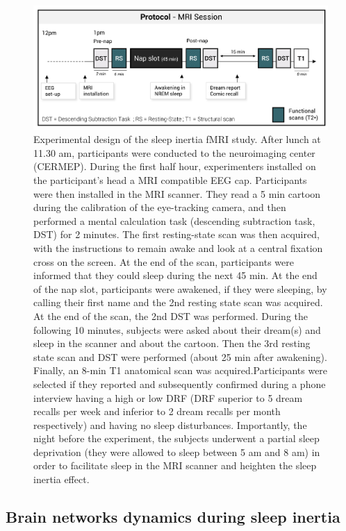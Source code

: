 \begin{figure}[htb]
	\includegraphics[width=\textwidth]{Fig/Intro/Intro_paradigm_fMRI/Intro_paradigm_fMRI.png}
	\caption[Experimental design of the fMRI study]{Experimental design of the sleep inertia fMRI study. After lunch at 11.30 am, participants were conducted to the neuroimaging center (CERMEP). During the first half hour, experimenters installed on the participant’s head a MRI compatible EEG cap. Participants were then installed in the MRI scanner. They read a 5 min cartoon during the calibration of the eye-tracking camera, and then performed a mental calculation task (descending subtraction task, DST) for 2 minutes. The first resting-state scan was then acquired, with the instructions to remain awake and look at a central fixation cross on the screen. At the end of the scan, participants were informed that they could sleep during the next 45 min. At the end of the nap slot, participants were awakened, if they were sleeping, by calling their first name and the 2nd resting state scan was acquired. At the end of the scan, the 2nd DST was performed. During the following 10 minutes, subjects were asked about their dream(s) and sleep in the scanner and about the cartoon. Then the 3rd resting state scan and DST were performed (about 25 min after awakening). Finally, an 8-min T1 anatomical scan was acquired.Participants were selected if they reported and subsequently confirmed during a phone interview having a high or low DRF (DRF superior to 5 dream recalls per week and inferior to 2 dream recalls per month respectively) and having no sleep disturbances. Importantly, the night before the experiment, the subjects underwent a partial sleep deprivation (they were allowed to sleep between 5 am and 8 am) in order to facilitate sleep in the MRI scanner and heighten the sleep inertia effect.}
	\label{fig:intro:problematics-fmri-paradigm}
\end{figure}

\subsection{Brain networks dynamics during sleep inertia}
\label{sec:problematic:inertia:overview}


